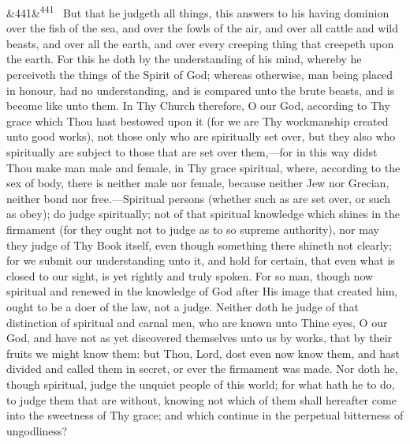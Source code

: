 \documentclass[12pt]{article}
\newcommand{\para}[1][]{\par\noindent\ifx&#1&\else\textsuperscript{\footnotesize #1}~\fi}
\begin{document}
\para[441] But that he judgeth all things, this answers to his having dominion over the fish of the sea, and over the fowls of the air, and over all cattle and wild beasts, and over all the earth, and over every creeping thing that creepeth upon the earth. For this he doth by the understanding of his mind, whereby he perceiveth the things of the Spirit of God; whereas otherwise, man being placed in honour, had no understanding, and is compared unto the brute beasts, and is become like unto them. In Thy Church therefore, O our God, according to Thy grace which Thou hast bestowed upon it (for we are Thy workmanship created unto good works), not those only who are spiritually set over, but they also who spiritually are subject to those that are set over them,---for in this way didst Thou make man male and female, in Thy grace spiritual, where, according to the sex of body, there is neither male nor female, because neither Jew nor Grecian, neither bond nor free.---Spiritual persons (whether such as are set over, or such as obey); do judge spiritually; not of that spiritual knowledge which shines in the firmament (for they ought not to judge as to so supreme authority), nor may they judge of Thy Book itself, even though something there shineth not clearly; for we submit our understanding unto it, and hold for certain, that even what is closed to our sight, is yet rightly and truly spoken. For so man, though now spiritual and renewed in the knowledge of God after His image that created him, ought to be a doer of the law, not a judge. Neither doth he judge of that distinction of spiritual and carnal men, who are known unto Thine eyes, O our God, and have not as yet discovered themselves unto us by works, that by their fruits we might know them: but Thou, Lord, dost even now know them, and hast divided and called them in secret, or ever the firmament was made. Nor doth he, though spiritual, judge the unquiet people of this world; for what hath he to do, to judge them that are without, knowing not which of them shall hereafter come into the sweetness of Thy grace; and which continue in the perpetual bitterness of ungodliness?
\end{document}
